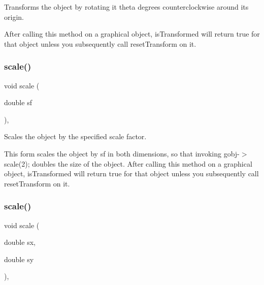 Transforms the object by rotating it {\ttfamily theta} degrees counterclockwise around its origin. 

After calling this method on a graphical object, {\ttfamily is\+Transformed} will return {\ttfamily true} for that object unless you subsequently call {\ttfamily reset\+Transform} on it. \mbox{\label{classGObject_ad2e1900f730475c2d044817db03b38d6}} 
\subsubsection{\texorpdfstring{scale()}{scale()}\hspace{0.1cm}{\footnotesize\ttfamily [1/2]}}
{\footnotesize\ttfamily void scale (\begin{DoxyParamCaption}\item[{double}]{sf }\end{DoxyParamCaption})\hspace{0.3cm}{\ttfamily [virtual]}, {\ttfamily [inherited]}}



Scales the object by the specified scale factor. 

This form scales the object by {\ttfamily sf} in both dimensions, so that invoking {\ttfamily gobj-\/$>$scale(2);} doubles the size of the object. After calling this method on a graphical object, {\ttfamily is\+Transformed} will return {\ttfamily true} for that object unless you subsequently call {\ttfamily reset\+Transform} on it. \mbox{\label{classGObject_a63641f69d610d0b951357d35a0c3b1e3}} 
\subsubsection{\texorpdfstring{scale()}{scale()}\hspace{0.1cm}{\footnotesize\ttfamily [2/2]}}
{\footnotesize\ttfamily void scale (\begin{DoxyParamCaption}\item[{double}]{sx,  }\item[{double}]{sy }\end{DoxyParamCaption})\hspace{0.3cm}{\ttfamily [virtual]}, {\ttfamily [inherited]}}



